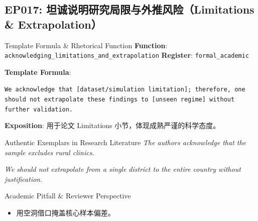 \subsection{EP017: 坦诚说明研究局限与外推风险（Limitations \& Extrapolation）}\label{sec:ep:EP017}
\begin{ConceptBox}{Template Formula \& Rhetorical Function}
\textbf{Function}: \texttt{acknowledging\_limitations\_and\_extrapolation} \quad \textbf{Register}: \texttt{formal\_academic}\par\vspace{3pt}
\textbf{Template Formula}:\par\noindent\texttt{We acknowledge that [dataset/simulation limitation]; therefore, one should not extrapolate these findings to [unseen regime] without further validation.}\par\vspace{4pt}
\textbf{Exposition}: 用于论文 Limitations 小节，体现成熟严谨的科学态度。
\end{ConceptBox}
\begin{ExampleBox}{Authentic Exemplars in Research Literature}
\textit{The authors acknowledge that the sample excludes rural clinics.}\par\vspace{2pt}
\textit{We should not extrapolate from a single district to the entire country without justification.}\par\vspace{2pt}
\end{ExampleBox}
\begin{TipBox}{Academic Pitfall \& Reviewer Perspective}
\begin{itemize}[leftmargin=1.5em, itemsep=1pt]
  \item 用空洞借口掩盖核心样本偏差。
\end{itemize}
\end{TipBox}
\vspace{6pt}
